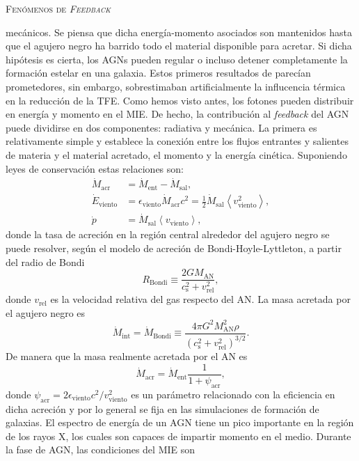 \documentclass[xcolor=dvipsnames,4pt,hyperref={colorlinks,citecolor=black,linkcolor=black,urlcolor=black}]{beamer}
\begin{document}
\begin{frame}[allowframebreaks]{\textsc{Fenómenos de \emph{Feedback}}}
\begin{description}
mecánicos. Se piensa que dicha energía-momento asociados son mantenidos hasta que el agujero negro
ha barrido todo el material disponible para acretar. Si dicha hipótesis es cierta, los AGNs pueden
regular o incluso detener completamente la formación estelar en una galaxia.
Estos primeros resultados de \citet{Springel2005a} parecían prometedores, sin embargo, sobrestimaban
artificialmente la influcencia térmica en la reducción de la TFE. Como hemos visto antes, los
fotones pueden distribuir en energía y momento en el MIE. De hecho, la contribución al
\emph{feedback} del AGN puede dividirse en dos componentes: radiativa y mecánica. La primera es
relativamente simple y establece la conexión entre los flujos entrantes y salientes de materia y el
material acretado, el momento y la energía cinética. Suponiendo leyes de conservación estas
relaciones son:
%
\begin{align}
\dot{M}_\text{acr}    &= \dot{M}_\text{ent} - \dot{M}_\text{sal}, \nonumber\\
\dot{E}_\text{viento} &= \epsilon_\text{viento}\dot{M}_\text{acr}c^2 = \frac{1}{2}\dot{M}_\text{sal}\left<v_\text{viento}^2\right>, \nonumber\\
\dot{p}               &= \dot{M}_\text{sal}\left<v_\text{viento}\right>, \nonumber
\end{align}
%
donde la tasa de acreción en la región central alrededor del agujero negro se puede resolver, según
el modelo de acreción de Bondi-Hoyle-Lyttleton, a partir del radio de Bondi
%
$$
R_\text{Bondi} \equiv \frac{2GM_\text{AN}}{c_\text{s}^2 + v_\text{rel}^2},
$$
%
donde $v_\text{rel}$ es la velocidad relativa del gas respecto del AN. La masa acretada por el
agujero negro es
%
$$
\dot{M}_\text{int} = \dot{M}_\text{Bondi} \equiv \frac{4\pi G^2M_\text{AN}^2\rho}{\left(c_\text{s}^2 + v_\text{rel}^2\right)^{3/2}}.
$$
%
De manera que la masa realmente acretada por el AN es
%
$$
\dot{M}_\text{acr} = \dot{M}_\text{ent}\frac{1}{1+\psi_\text{acr}},
$$
%
donde $\psi_\text{acr} = 2\epsilon_\text{viento}c^2/v_\text{viento}^2$ es un parámetro relacionado
con la eficiencia en dicha acreción y por lo general se fija en las simulaciones de formación de
galaxias.
%
%
El espectro de energía de un AGN tiene un pico importante en la región de los rayos X, los cuales
son capaces de impartir momento en el medio. Durante la fase de AGN, las condiciones del MIE son

\end{description}
\end{frame}
\end{document}
